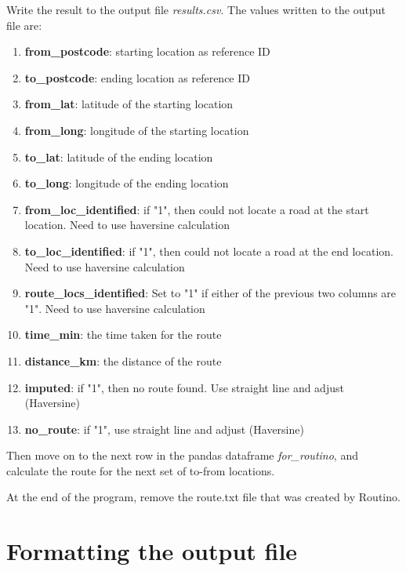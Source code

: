 \documentclass{article}
\begin{document}
\begin{flushleft}
Write the result to the output file \textit{results.csv}. The values written to the output file are:
\begin{enumerate}
	\item \textbf{from\_postcode}: starting location as reference ID
	\item \textbf{to\_postcode}: ending location as reference ID
	\item \textbf{from\_lat}: latitude of the starting location
	\item \textbf{from\_long}: longitude of the starting location
	\item \textbf{to\_lat}: latitude of the ending location
	\item \textbf{to\_long}: longitude of the ending location
	\item \textbf{from\_loc\_identified}: if "1", then could not locate a road at the start location. Need to use haversine calculation
	\item \textbf{to\_loc\_identified}: if "1", then could not locate a road at the end location. Need to use haversine calculation
	\item \textbf{route\_locs\_identified}: Set to "1" if either of the previous two columns are "1". Need to use haversine calculation
	\item \textbf{time\_min}: the time taken for the route
	\item \textbf{distance\_km}: the distance of the route
	\item \textbf{imputed}: if "1", then no route found. Use straight line and adjust (Haversine)
	\item \textbf{no\_route}: if "1", use straight line and adjust (Haversine)
\end{enumerate}

\vspace{\baselineskip}

Then move on to the next row in the pandas dataframe \textit{for\_routino}, and calculate the route for the next set of to-from locations.\\

\vspace{\baselineskip}

At the end of the program, remove the route.txt file that was created by Routino.
 
\section{Formatting the output file}


\end{flushleft}
\end{document}
